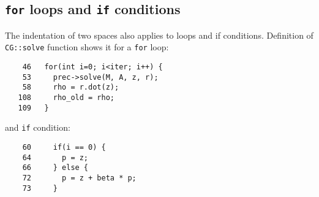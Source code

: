 \subsection{{\tt for} loops and {\tt if} conditions}

The indentation of two spaces also applies to loops and if conditions. 
Definition of {\tt CG::solve} function shows it for a {\tt for} loop:
%
{\small \begin{verbatim}
    46   for(int i=0; i<iter; i++) {
    53     prec->solve(M, A, z, r);
    58     rho = r.dot(z);
   108     rho_old = rho;
   109   }
\end{verbatim}}
% 
and {\tt if} condition:
%
{\small \begin{verbatim}
    60     if(i == 0) {
    64       p = z;
    66     } else {
    72       p = z + beta * p;
    73     }
\end{verbatim}}

\vspace*{5mm}  %

